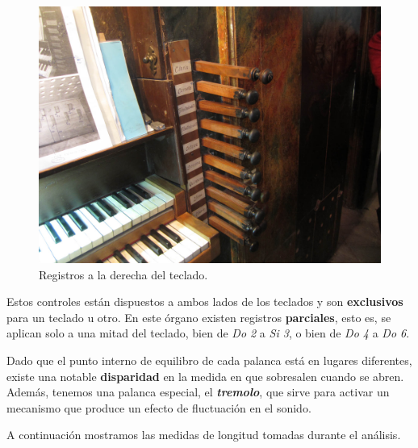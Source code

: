 \begin{figure}[H]
	\noindent \begin{centering}
		\includegraphics[width=\linewidth*2/3]{capitulo3/registros}
		\par\end{centering}
	\smallskip
	\caption{\label{fig:registros} Registros a la derecha del teclado.}
\end{figure} 

\smallskip

Estos controles están dispuestos a ambos lados de los teclados y son \textbf{exclusivos} para un teclado u otro. En este órgano existen registros \textbf{parciales}, esto es, se aplican solo a una mitad del teclado, bien de \textit{Do 2} a \textit{Si 3}, o bien de \textit{Do 4} a \textit{Do 6}.

Dado que el punto interno de equilibro de cada palanca está en lugares diferentes, existe una notable \textbf{disparidad} en la medida en que sobresalen cuando se abren. Además, tenemos una palanca especial, el \textbf{\textit{tremolo}}, que sirve para activar un mecanismo que produce un efecto de fluctuación en el sonido.

A continuación mostramos las medidas de longitud tomadas durante el análisis.

\smallskip

